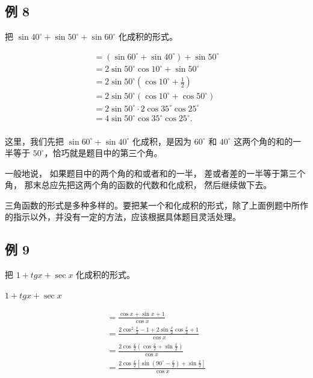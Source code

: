 \subsection{例 8}

把 \(\sin 40^{\circ} + \sin 50^{\circ} + \sin 60^{\circ}\)
化成积的形式。

\[
\begin{array}{l} = (\sin 60 ^{\circ} + \sin 40 ^{\circ}) + \sin 50 ^{\circ} \\ = 2 \sin 50 ^{\circ} \cos 10 ^{\circ} + \sin 50 ^{\circ} \\ = 2 \sin 50 ^{\circ} \left(\cos 10 ^{\circ} + \frac {1}{2}\right) \\ = 2 \sin 50 ^{\circ} (\cos 10 ^{\circ} + \cos 50 ^{\circ}) \\ = 2 \sin 50 ^{\circ} \cdot 2 \cos 35 ^{\circ} \cos 25 ^{\circ} \\ = 4 \sin 50 ^{\circ} \cos 35 ^{\circ} \cos 25 ^{\circ}. \\ \end{array}
\]

这里，我们先把 \(\sin 60^{\circ} + \sin 40^{\circ}\) 化成积，是因为
\(60^{\circ}\) 和 \(40^{\circ}\) 这两个角的和的一半等于
\(50^{\circ}\)，恰巧就是题目中的第三个角。

一般地说， 如果题目中的两个角的和或者和的一半，
差或者差的一半等于第三个角， 那末总应先把这两个角的函数的代数和化成积，
然后继续做下去。

三角函数的形式是多种多样的。要把某一个和化成积的形式，除了上面例题中所作的指示以外，并没有一定的方法，应该根据具体题目灵活处理。

\subsection{例 9}

把 \(1 + tg x + \sec x\) 化成积的形式。

 \(1+tg x+\sec x\)

\[
\begin{array}{l} = \frac {\cos x + \sin x + 1}{\cos x} \\ = \frac {2 \cos^ {2} \frac {x}{2} - 1 + 2 \sin \frac {x}{2} \cos \frac {x}{2} + 1}{\cos x} \\ = \frac {2 \cos \frac {x}{2} \left(\cos \frac {x}{2} + \sin \frac {x}{2}\right)}{\cos x} \\ = \frac {2 \cos \frac {x}{2} \left[ \sin \left(90 ^{\circ} - \frac {x}{2}\right) + \sin \frac {x}{2} \right]}{\cos x} \\ \end{array}
\]

